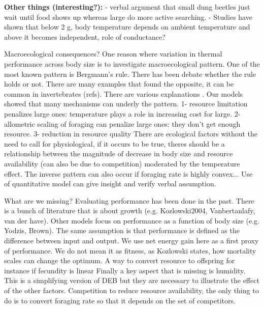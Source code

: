 \textbf{Other things (interesting?):} 
- verbal argument that small dung beetles just wait until food shows up whereas  large do more active searching.
- Studies have shown that below 2 g, body temperature depends on ambient temperature and above it becomes independent, role of conductance? 

Macroecological consequences?
One reason where variation in thermal performance across body size is to investigate macroecological pattern.
One of the most known pattern is Bergmann's rule.
There has been debate whether the rule holds or not.
There are many examples that found the opposite, it can be common in invertebrates (refs).
There are various explanations \citep{Chown2010}.
Our models showed that many mechanisms can underly the pattern.
1- resource limitation penalizes large ones: temperature plays a role in increasing cost for large.
2- allometric scaling of foraging can penalize large ones: they don't get enough resource. 
3- reduction in resource quality
There are ecological factors without the need to call for physiological, if it occurs to be true, theres should be a relationship between the magnitude of decrease in body size and resource availability (can also be due to competition) moderated by the temperature effect.
The inverse pattern can also occur if foraging rate is highly convex...
Use of quantitative model can give insight and verify verbal assumption.
 
What are we missing?
Evaluating performance has been done in the past.
There is a bunch of literature that is about growth  (e.g. Kozlowski2004, Vanbertanlafy, van der have). 
Other models focus on performance as a function of body size (e.g. Yodzis, Brown).
The same assumption is that performance is defined as the difference between input and output.
We use net energy gain here as a first proxy of performance.
We do not mean it as fitness, as Kozlowski states, how mortality scales can change the optimum.
A way to convert resource to offspring for instance if fecundity is linear
Finally a key aspect that is missing is humidity.
This is a simplifying version of DEB but they are necessary to illustrate the effect of the other factors.
Competition to reduce resource availability, the only thing to do is to convert foraging rate so that it depends on the set of competitors.


